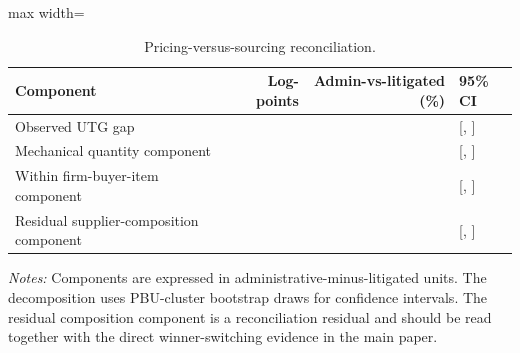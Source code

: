 \begin{table}[ht]
\centering
\caption{Pricing-versus-sourcing reconciliation.}
\label{tab:utg_reconciliation}
\begin{threeparttable}
\small
\setlength{\tabcolsep}{4pt}
\begin{adjustbox}{max width=\textwidth}
\begin{tabular}{p{.34\linewidth}rrp{.22\linewidth}}
\toprule
Component & Log-points & Admin-vs-litigated (\%) & 95\% CI \\
\midrule
Observed UTG gap & \BPutgObsLogGap{} & \BPutgObsPct{} & [\BPutgObsCIlow{}, \BPutgObsCIhigh{}] \\
Mechanical quantity component & \BPutgMechLogGap{} & \BPutgMechanicalCone{} & [\BPutgMechCIlow{}, \BPutgMechCIhigh{}] \\
Within firm-buyer-item component & \BPutgWithinLogGap{} & \BPutgWithinFirmOffset{} & [\BPutgWithinCIlow{}, \BPutgWithinCIhigh{}] \\
Residual supplier-composition component & \BPutgCompLogGap{} & \BPutgCompositionResidual{} & [\BPutgCompCIlow{}, \BPutgCompCIhigh{}] \\
\bottomrule
\end{tabular}
\end{adjustbox}
\begin{tablenotes}[flushleft]\footnotesize
\item \textit{Notes:} Components are expressed in administrative-minus-litigated units. The decomposition uses \BPutgReconBootB{} PBU-cluster bootstrap draws for confidence intervals. The residual composition component is a reconciliation residual and should be read together with the direct winner-switching evidence in the main paper.
\end{tablenotes}
\end{threeparttable}
\end{table}
